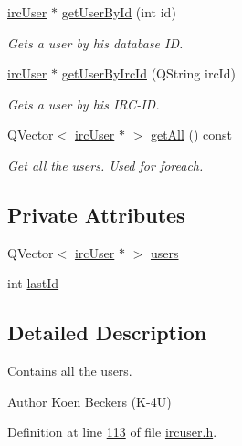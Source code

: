 \begin{DoxyCompactItemize}
\hyperlink{classserver_1_1irc_user}{irc\-User} $\ast$ \hyperlink{classserver_1_1irc_user_list_a4bf0057be15b4baf8528fa263be2a74a}{get\-User\-By\-Id} (int id)
\begin{DoxyCompactList}\small\item\em Gets a user by his database I\-D. \end{DoxyCompactList}\item 
\hyperlink{classserver_1_1irc_user}{irc\-User} $\ast$ \hyperlink{classserver_1_1irc_user_list_a105ff952c0e653bdc765adc58d3e702b}{get\-User\-By\-Irc\-Id} (Q\-String irc\-Id)
\begin{DoxyCompactList}\small\item\em Gets a user by his I\-R\-C-\/\-I\-D. \end{DoxyCompactList}\item 
Q\-Vector$<$ \hyperlink{classserver_1_1irc_user}{irc\-User} $\ast$ $>$ \hyperlink{classserver_1_1irc_user_list_aab10a6d6fdfb92580e68b84b1365f9b2}{get\-All} () const 
\begin{DoxyCompactList}\small\item\em Get all the users. Used for foreach. \end{DoxyCompactList}\end{DoxyCompactItemize}
\subsection*{Private Attributes}
\begin{DoxyCompactItemize}
\item 
Q\-Vector$<$ \hyperlink{classserver_1_1irc_user}{irc\-User} $\ast$ $>$ \hyperlink{classserver_1_1irc_user_list_aed148b0d15f108c3e08d4705033aa2d3}{users}
\item 
int \hyperlink{classserver_1_1irc_user_list_a1ed9d9889dcc65de41ed6988fc89bb13}{last\-Id}
\end{DoxyCompactItemize}


\subsection{Detailed Description}
Contains all the users. 

\begin{DoxyAuthor}{Author}
Koen Beckers (K-\/4\-U) 
\end{DoxyAuthor}


Definition at line \hyperlink{custom_irc_server_2ircuser_8h_source_l00113}{113} of file \hyperlink{custom_irc_server_2ircuser_8h_source}{ircuser.\-h}.



